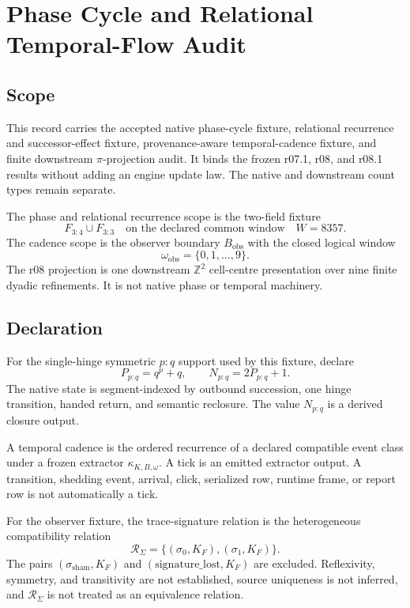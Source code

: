 \section{Phase Cycle and Relational Temporal-Flow Audit}\label{manual:phase-temporal-flow-audit}

\subsection{Scope}\label{manual:phase-temporal:scope}
This record carries the accepted native phase-cycle fixture, relational recurrence and successor-effect fixture, provenance-aware temporal-cadence fixture, and finite downstream \(\pi\)-projection audit. It binds the frozen r07.1, r08, and r08.1 results without adding an engine update law. The native and downstream count types remain separate.

The phase and relational recurrence scope is the two-field fixture
\[
F_{3:4}\cup F_{3:3}
\quad\text{on the declared common window}\quad
W=8357.
\]
The cadence scope is the observer boundary \(B_{\mathrm{obs}}\) with the closed logical window
\[
\omega_{\mathrm{obs}}=\{0,1,\ldots,9\}.
\]
The r08 projection is one downstream \(\mathbb Z^2\) cell-centre presentation over nine finite dyadic refinements. It is not native phase or temporal machinery.

\subsection{Declaration}\label{manual:phase-temporal:declaration}
For the single-hinge symmetric \(p{:}q\) support used by this fixture, declare
\[
P_{p:q}=q^p+q,
\qquad
N_{p:q}=2P_{p:q}+1.
\]
The native state is segment-indexed by outbound succession, one hinge transition, handed return, and semantic reclosure. The value \(N_{p:q}\) is a derived closure output.

A temporal cadence is the ordered recurrence of a declared compatible event class under a frozen extractor \(\kappa_{K,B,\omega}\). A tick is an emitted extractor output. A transition, shedding event, arrival, click, serialized row, runtime frame, or report row is not automatically a tick.

For the observer fixture, the trace-signature relation is the heterogeneous compatibility relation
\[
\mathcal R_{\Sigma}
=
\{(\sigma_0,K_F),(\sigma_1,K_F)\}.
\]
The pairs \((\sigma_{\mathrm{sham}},K_F)\) and \((\mathrm{signature\_lost},K_F)\) are excluded. Reflexivity, symmetry, and transitivity are not established, source uniqueness is not inferred, and \(\mathcal R_{\Sigma}\) is not treated as an equivalence relation.

